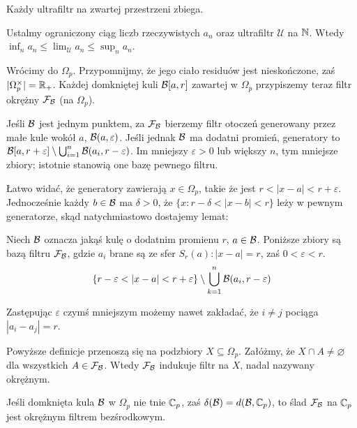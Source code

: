 \begin{fakt}
	Każdy ultrafiltr na zwartej przestrzeni zbiega.
\end{fakt}

\begin{przyklad}
	Ustalmy ograniczony ciąg liczb rzeczywistych $a_n$ oraz ultrafiltr $\mathcal U$ na $\mathbb N$.
	Wtedy $\inf_n a_n \le \lim_{\mathcal U} a_n \le \sup_n a_n$.
\end{przyklad}

Wrócimy do $\Omega_p$.
Przypomnijmy, że jego ciało residuów jest nieskończone, zaś $|\Omega_p^\times| = \mathbb R_+$.
Każdej domkniętej kuli $\mathcal B[a, r]$ zawartej w $\Omega_p$ przypiszemy teraz filtr okrężny $\mathcal F_\mathcal B$ (na $\Omega_p$).

Jeśli $\mathcal B$ jest jednym punktem, za $\mathcal F_\mathcal B$ bierzemy filtr otoczeń generowany przez małe kule wokół $a$, $\mathcal B(a, \varepsilon)$.
Jeśli jednak $\mathcal B$ ma dodatni promień, generatory to $\mathcal B[a, r + \varepsilon] \setminus \bigcup_{i=1}^n \mathcal B (a_i, r - \varepsilon)$.
Im mniejszy $\varepsilon > 0$ lub większy $n$, tym mniejsze zbiory; istotnie stanowią one bazę pewnego filtru.

Łatwo widać, że generatory zawierają $x \in \Omega_p$, takie że jest $r < |x-a| < r + \varepsilon$.
Jednocześnie każdy $b \in \mathcal B$ ma $\delta > 0$, że $\{x : r - \delta < |x - b| <r\}$ leży w pewnym generatorze, skąd natychmiastowo dostajemy lemat:

\begin{lemat}
	Niech $\mathcal B$ oznacza jakąś kulę o dodatnim promienu $r$, $a \in \mathcal B$.
	Poniższe zbiory są bazą filtru $\mathcal F_\mathcal B$, gdzie $a_i$ brane są ze sfer $S_r(a) : |x - a| = r$, zaś $0 < \varepsilon < r$.
	\[
		\left\{ r-\varepsilon < |x-a| < r+\varepsilon\right\} \setminus \bigcup_{k = 1}^n \mathcal B(a_i, r - \varepsilon)
	\]
\end{lemat}

Zastępując $\varepsilon$ czymś mniejszym możemy nawet zakładać, że $i \neq j$ pociąga $|a_i - a_j| = r$.

Powyższe definicje przenoszą się na podzbiory $X \subseteq \Omega_p$.
Załóżmy, że $X \cap A \neq \varnothing$  dla wszystkich $A \in \mathcal F_\mathcal B$.
Wtedy $\mathcal F_\mathcal B$ indukuje filtr na $X$, nadal nazywany okrężnym.

\begin{przyklad}[$X=\C_p$]
	Jeśli domknięta kula $\mathcal B$ w $\Omega_p$ nie tnie $\mathbb C_p$, zaś $\delta(\mathcal B) = d(\mathcal B, \mathbb C_p)$, to ślad $\mathcal F_\mathcal B$ na $\mathbb C_p$ jest okrężnym filtrem bezśrodkowym.
\end{przyklad}
